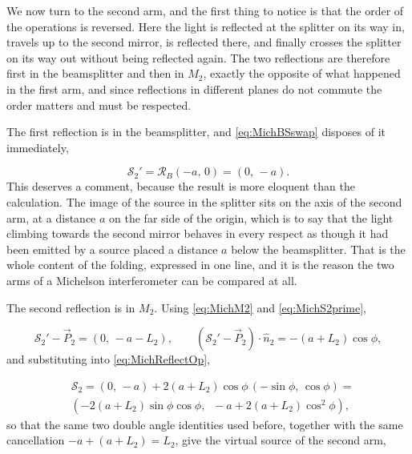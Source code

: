         We now turn to the second arm, and the first thing to notice is that the order of the operations is reversed. Here the light is reflected at the splitter on its way in, travels up to the second mirror, is reflected there, and finally crosses the splitter on its way out without being reflected again. The two reflections are therefore first in the beamsplitter and then in $M_2$, exactly the opposite of what happened in the first arm, and since reflections in different planes do not commute the order matters and must be respected.

        The first reflection is in the beamsplitter, and \ref{eq:MichBSswap} disposes of it immediately,

        \begin{equation}\label{eq:MichS2prime}
            \mathcal{S}_2' = \mathcal{R}_B\left(-a,\,0\right) = \left(0,\,-a\right).
        \end{equation}
        This deserves a comment, because the result is more eloquent than the calculation. The image of the source in the splitter sits on the axis of the second arm, at a distance $a$ on the far side of the origin, which is to say that the light climbing towards the second mirror behaves in every respect as though it had been emitted by a source placed a distance $a$ below the beamsplitter. That is the whole content of the folding, expressed in one line, and it is the reason the two arms of a Michelson interferometer can be compared at all.

        The second reflection is in $M_2$. Using \ref{eq:MichM2} and \ref{eq:MichS2prime},

        \begin{equation*}
            \mathcal{S}_2'-\vec{P}_2 = \left(0,\,-a-L_2\right), \qquad
            \left(\mathcal{S}_2'-\vec{P}_2\right)\cdot\hat{n}_2 = -\left(a+L_2\right)\cos\phi ,
        \end{equation*}
        and substituting into \ref{eq:MichReflectOp},

        \begin{align*}
            & \mathcal{S}_2 = \left(0,\,-a\right) + 2\left(a+L_2\right)\cos\phi\,\left(-\sin\phi,\,\cos\phi\right) = \\
            & \left(-2\left(a+L_2\right)\sin\phi\cos\phi,\;\; -a + 2\left(a+L_2\right)\cos^{2}\phi\right),
        \end{align*}
        so that the same two double angle identities used before, together with the same cancellation $-a+(a+L_2) = L_2$, give the virtual source of the second arm,

